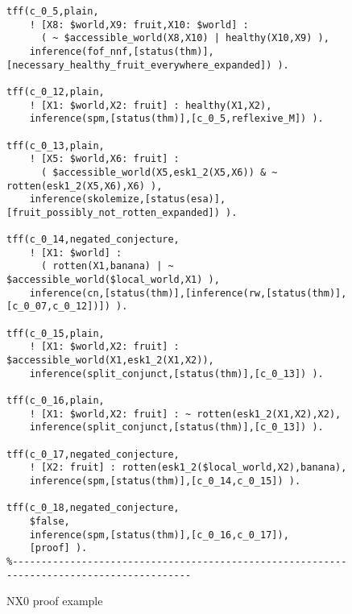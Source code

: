 \documentclass{ceurart}
\begin{document}
\begin{figure}[h!]
{{\begin{verbatim}
tff(c_0_5,plain,
    ! [X8: $world,X9: fruit,X10: $world] :
      ( ~ $accessible_world(X8,X10) | healthy(X10,X9) ),
    inference(fof_nnf,[status(thm)],[necessary_healthy_fruit_everywhere_expanded]) ).

tff(c_0_12,plain,
    ! [X1: $world,X2: fruit] : healthy(X1,X2),
    inference(spm,[status(thm)],[c_0_5,reflexive_M]) ).

tff(c_0_13,plain,
    ! [X5: $world,X6: fruit] :
      ( $accessible_world(X5,esk1_2(X5,X6)) & ~ rotten(esk1_2(X5,X6),X6) ),
    inference(skolemize,[status(esa)],[fruit_possibly_not_rotten_expanded]) ).

tff(c_0_14,negated_conjecture,
    ! [X1: $world] :
      ( rotten(X1,banana) | ~ $accessible_world($local_world,X1) ),
    inference(cn,[status(thm)],[inference(rw,[status(thm)],[c_0_07,c_0_12])]) ).

tff(c_0_15,plain,
    ! [X1: $world,X2: fruit] : $accessible_world(X1,esk1_2(X1,X2)),
    inference(split_conjunct,[status(thm)],[c_0_13]) ).

tff(c_0_16,plain,
    ! [X1: $world,X2: fruit] : ~ rotten(esk1_2(X1,X2),X2),
    inference(split_conjunct,[status(thm)],[c_0_13]) ).

tff(c_0_17,negated_conjecture,
    ! [X2: fruit] : rotten(esk1_2($local_world,X2),banana),
    inference(spm,[status(thm)],[c_0_14,c_0_15]) ).

tff(c_0_18,negated_conjecture,
    $false,
    inference(spm,[status(thm)],[c_0_16,c_0_17]),
    [proof] ).
%------------------------------------------------------------------------------------------
\end{verbatim}
}}
\caption{NX0 proof example}
\label{NX0Proof}
\end{figure}
\end{document}
